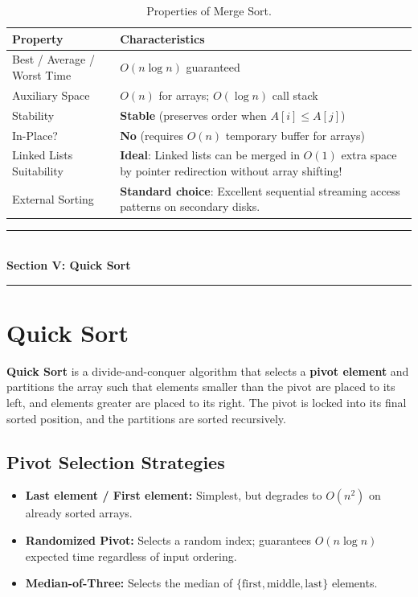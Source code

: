 \begin{table}[htbp]
\centering
\small
\begin{tabularx}{\textwidth}{l X}
\toprule
\textbf{Property} & \textbf{Characteristics} \\
\midrule
Best / Average / Worst Time & $\boxed{O(n \log n)}$ guaranteed \\
Auxiliary Space             & $O(n)$ for arrays; $O(\log n)$ call stack \\
Stability                   & \textbf{Stable} (preserves order when $A[i] \leq A[j]$) \\
In-Place?                   & \textbf{No} (requires $O(n)$ temporary buffer for arrays) \\
Linked Lists Suitability    & \textbf{Ideal}: Linked lists can be merged in $O(1)$ extra space by pointer redirection without array shifting! \\
External Sorting            & \textbf{Standard choice}: Excellent sequential streaming access patterns on secondary disks. \\
\bottomrule
\end{tabularx}
\caption{Properties of Merge Sort.}
\end{table}

\newpage
\begin{center}
\vspace{0.5em}
{\color{primary}\rule{0.45\textwidth}{1.2pt}}\\[4pt]
{\Large\bfseries\color{primary} Section V: Quick Sort}\\[2pt]
{\color{primary}\rule{0.45\textwidth}{1.2pt}}
\vspace{0.5em}
\end{center}

\section{Quick Sort}

\textbf{Quick Sort} is a divide-and-conquer algorithm that selects a \textbf{pivot element} and partitions the array such that elements smaller than the pivot are placed to its left, and elements greater are placed to its right. The pivot is locked into its final sorted position, and the partitions are sorted recursively.

\subsection{Pivot Selection Strategies}
\begin{itemize}
    \item \textbf{Last element / First element:} Simplest, but degrades to $O(n^2)$ on already sorted arrays.
    \item \textbf{Randomized Pivot:} Selects a random index; guarantees $O(n \log n)$ expected time regardless of input ordering.
    \item \textbf{Median-of-Three:} Selects the median of $\{\text{first}, \text{middle}, \text{last}\}$ elements.
\end{itemize}


